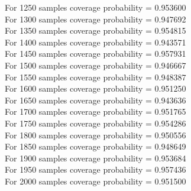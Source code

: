 \documentclass{article}
\begin{document}
For 1250 samples coverage probability = 0.953600\\
For 1300 samples coverage probability = 0.947692\\
For 1350 samples coverage probability = 0.954815\\
For 1400 samples coverage probability = 0.943571\\
For 1450 samples coverage probability = 0.957931\\
For 1500 samples coverage probability = 0.946667\\
For 1550 samples coverage probability = 0.948387\\
For 1600 samples coverage probability = 0.951250\\
For 1650 samples coverage probability = 0.943636\\
For 1700 samples coverage probability = 0.951765\\
For 1750 samples coverage probability = 0.954286\\
For 1800 samples coverage probability = 0.950556\\
For 1850 samples coverage probability = 0.948649\\
For 1900 samples coverage probability = 0.953684\\
For 1950 samples coverage probability = 0.957436\\
For 2000 samples coverage probability = 0.951500\\
\end{document}
